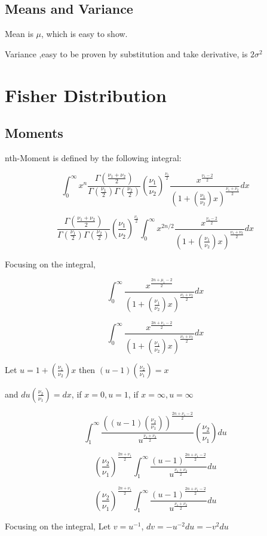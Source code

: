 \documentclass{article}
\begin{document}
\subsection{Means and Variance}

Mean is $\mu$, which is easy to show.

Variance ,easy to be proven by substitution and take derivative, is $2\sigma^2$

\section{Fisher Distribution}

\subsection{Moments}
nth-Moment is defined by the following integral:

$$\int_{0}^{\infty}x^n\frac{\Gamma(\frac{\nu_1+\nu_2}{2})}{\Gamma(\frac{\nu_1}{2})\Gamma(\frac{\nu_2}{2})} (\frac{\nu_1}{\nu_2})^{\frac{\nu_1}{2}} \frac{x^{\frac{\nu_1-2}{2}}}{(1+(\frac{\nu_1}{\nu_2})x)^{\frac{\nu_1+\nu_2}{2}}}dx$$

$$\frac{\Gamma(\frac{\nu_1+\nu_2}{2})}{\Gamma(\frac{\nu_1}{2})\Gamma(\frac{\nu_2}{2})} (\frac{\nu_1}{\nu_2})^{\frac{\nu_1}{2}}\int_{0}^{\infty}x^{2n/2} \frac{x^{\frac{\nu_1-2}{2}}}{(1+(\frac{\nu_1}{\nu_2})x)^{\frac{\nu_1+\nu_2}{2}}}dx$$

Focusing on the integral,

$$\int_{0}^{\infty} \frac{x^{\frac{2n+\mu_1-2}{2}}}{(1+(\frac{\nu_1}{\nu_2})x)^{\frac{\nu_1+\nu_2}{2}}}dx$$


$$\int_{0}^{\infty} \frac{x^{\frac{2n+\nu_1-2}{2}}}{(1+(\frac{\nu_1}{\nu_2})x)^{\frac{\nu_1+\nu_2}{2}}}dx$$

Let $u = 1+(\frac{\nu_1}{\nu_2})x$ then $(u-1)(\frac{\nu_2}{\nu_1})= x$

and $du(\frac{\nu_2}{\nu_1})= dx$, if $x =0,u=1$, if $x=\infty, u = \infty$

$$\int_{1}^{\infty} \frac{((u-1)(\frac{\nu_2}{\nu_1}))^{\frac{2n+\nu_1-2}{2}}}{u^{\frac{\nu_1+\nu_2}{2}}}(\frac{\nu_2}{\nu_1})du$$

$$(\frac{\nu_2}{\nu_1})^{\frac{2n+\nu_1}{2}} \int_{1}^{\infty} \frac{(u-1)^{\frac{2n+\nu_1-2}{2}}}{u^{\frac{\nu_1+\nu_2}{2}}}du$$


$$(\frac{\nu_2}{\nu_1})^{\frac{2n+\nu_1}{2}} \int_{1}^{\infty} \frac{(u-1)^{\frac{2n+\nu_1-2}{2}}}{u^{\frac{\nu_1+\nu_2}{2}}}du$$
 
Focusing on the integral, Let $v =u^{-1}$, $dv = -u^{-2} du = -v^2du$
\end{document}

